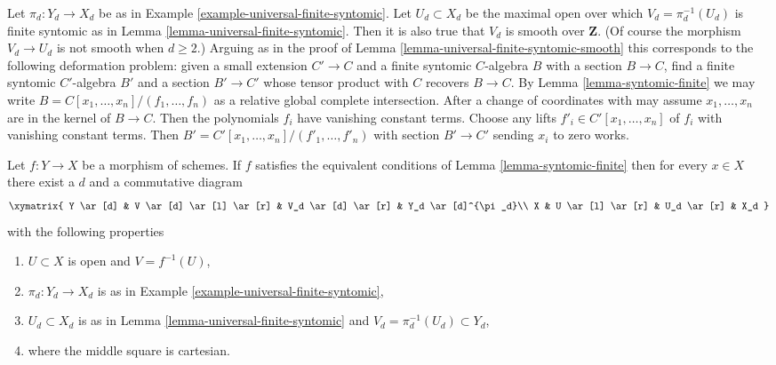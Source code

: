\begin{remark}
\label{remark-universal-finite-syntomic-smooth-top}
Let $\pi_d : Y_d \to X_d$ be as in
Example \ref{example-universal-finite-syntomic}.
Let $U_d \subset X_d$ be the maximal open over which
$V_d = \pi_d^{-1}(U_d)$ is finite syntomic as in
Lemma \ref{lemma-universal-finite-syntomic}.
Then it is also true that $V_d$ is smooth over $\mathbf{Z}$.
(Of course the morphism $V_d \to U_d$ is not smooth when $d \geq 2$.)
Arguing as in the proof of Lemma \ref{lemma-universal-finite-syntomic-smooth}
this corresponds to the following deformation
problem: given a small extension $C' \to C$ and
a finite syntomic $C$-algebra $B$ with a section $B \to C$,
find a finite syntomic $C'$-algebra $B'$ and a section $B' \to C'$
whose tensor product with $C$ recovers $B \to C$.
By Lemma \ref{lemma-syntomic-finite} we may write
$B = C[x_1, \ldots, x_n]/(f_1, \ldots, f_n)$ as
a relative global complete intersection.
After a change of coordinates with may assume
$x_1, \ldots, x_n$ are in the kernel of $B \to C$.
Then the polynomials $f_i$ have vanishing constant terms.
Choose any lifts $f'_i \in C'[x_1, \ldots, x_n]$ of $f_i$
with vanishing constant terms. Then 
$B' = C'[x_1, \ldots, x_n]/(f'_1, \ldots, f'_n)$
with section $B' \to C'$ sending $x_i$ to zero works.
\end{remark}

\begin{lemma}
\label{lemma-locally-comes-from-universal-finite}
Let $f : Y \to X$ be a morphism of schemes. If $f$ satisfies the equivalent
conditions of Lemma \ref{lemma-syntomic-finite} then for every
$x \in X$ there exist a $d$ and a commutative diagram
$$
\xymatrix{
Y \ar[d] &
V \ar[d] \ar[l] \ar[r] &
V_d \ar[d] \ar[r] &
Y_d \ar[d]^{\pi_d}\\
X &
U \ar[l] \ar[r] &
U_d \ar[r] &
X_d
}
$$
with the following properties
\begin{enumerate}
\item $U \subset X$ is open and $V = f^{-1}(U)$,
\item $\pi_d : Y_d \to X_d$ is as in
Example \ref{example-universal-finite-syntomic},
\item $U_d \subset X_d$ is as in Lemma \ref{lemma-universal-finite-syntomic}
and $V_d = \pi_d^{-1}(U_d) \subset Y_d$,
\item where the middle square is cartesian.
\end{enumerate}
\end{lemma}

